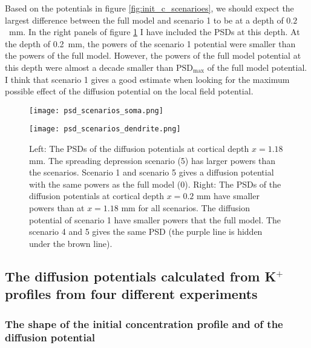 \documentclass{article}
\begin{document}
Based on the potentials in figure \ref{fig:init_c_scenarioes}, we should expect the largest difference between the full model and scenario 1 to be at a depth of $0.2$~mm. In the right panels of figure \ref{fig:psd_scenarios} I have included the PSDs at this depth. At the depth of 0.2~mm, the powers of the scenario 1 potential were smaller than the powers of the full model. However, the powers of the full model potential at this depth were almost a decade smaller than $\text{PSD}_{\text{max}}$ of the full model potential. I think that scenario 1 gives a good estimate when looking for the maximum possible effect of the diffusion potential on the local field potential.

\begin{figure}[!tbp]
  \centering
  \begin{minipage}[b]{0.45\textwidth}
    \texttt{[image: psd\_scenarios\_soma.png]}

  \end{minipage}
\hfill
  \begin{minipage}[b]{0.45\textwidth}
    \texttt{[image: psd\_scenarios\_dendrite.png]}

  \end{minipage}

  \caption{Left: The PSDs of the diffusion potentials at cortical depth $x=1.18$ mm. The spreading depression scenario (5) has larger powers than the scenarios. Scenario 1 and scenario 5 gives a diffusion potential with the same powers as the full model (0). 
  Right: The PSDs of the diffusion potentials at cortical depth $x=0.2$ mm have smaller powers than at $x=1.18$ mm for all scenarios. The diffusion potential of scenario 1 have smaller powers that the full model. The scenario 4 and 5 gives the same PSD (the purple line is hidden under the brown line). }
  \label{fig:psd_scenarios}
\end{figure} 

 
\subsection{The diffusion potentials calculated from K$^+$ profiles from four different experiments}\label{diffusion potentials}
\subsubsection{The shape of the initial concentration profile and of the diffusion potential}\label{c(x,t) and phi(x,t)}
\end{document}
